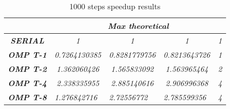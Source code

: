 \begin{table}
    \centering
    \begin{tabular}{|c|c|c|c|c|} 
    \hline
                                                    & \multicolumn{4}{c|}{\textbf{\textit{Max theoretical}}}                                                                                                              \\ 
    \hline
    \textbf{\textit{SERIAL}}                        & \textit{1}                                & \textit{1}                               & \textit{1}                                & \textit{1}                       \\ 
    \hline
    \textbf{\textit{OMP T-1}}                       & \textit{0.7264130385}                     & \textit{0.8281779756}                    & \textit{0.8213643726}                     & \textit{1}                       \\ 
    \hline
    \textbf{\textit{OMP T-2}}                       & \textit{1.362060426}                      & \textit{1.565833092}                     & \textit{1.563965464}                      & \textit{2}                       \\ 
    \hline
    \textbf{\textit{OMP T-4}}                       & \textit{2.338335955}                      & \textit{2.885140616}                     & \textit{2.906996368}                      & \textit{4}                       \\ 
    \hline
    \multicolumn{1}{|l|}{\textbf{\textit{OMP T-8}}} & \multicolumn{1}{l|}{\textit{1.276842716}} & \multicolumn{1}{l|}{\textit{2.72556772}} & \multicolumn{1}{l|}{\textit{2.785599356}} & \multicolumn{1}{l|}{\textit{4}}  \\
    \hline
    \end{tabular}
    \caption{1000 steps speedup results}
\end{table}